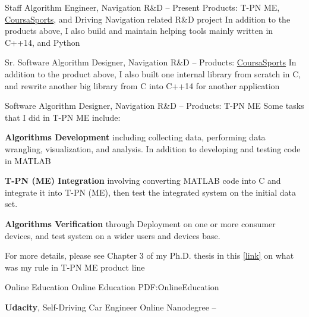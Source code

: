 \documentclass[letterpaper,MMMyyyy,nonstopmode]{simpleresumecv}
\begin{document}
\begin{Body}
\Gap
Staff Algorithm Engineer, Navigation R\&D
\hfill
{} --
Present
\BulletItem
Products:
T-PN ME, \href{http://www.coursasports.com/}{CoursaSports}, and Driving Navigation related R\&D project
\BulletItem
In addition to the products above, I also build and maintain helping tools mainly\newline 
written in C++14, and Python

\Gap
Sr. Software Algorithm Designer, Navigation R\&D
\hfill
{} --
\BulletItem
Products:
\href{http://www.coursasports.com/}{CoursaSports}
\BulletItem
In addition to the product above, I also built one internal library from scratch in C,\newline
and rewrite another big library from C into C++14 for another application

\BigGap
Software Algorithm Designer, Navigation R\&D
\hfill
{} --
\BulletItem
Products: T-PN ME
\BulletItem
Some tasks that I did in T-PN ME include: 
\begin{Detail}
\SubBulletItem
\textbf{Algorithms Development} including collecting data, performing data wrangling, visualization, and analysis. In addition to developing and testing code in MATLAB

\SubBulletItem
\textbf{T-PN (ME) Integration} involving converting MATLAB code into C and integrate it into T-PN (ME), then test the integrated system on the initial data set. 

\SubBulletItem
\textbf{Algorithms Verification} through Deployment on one or more consumer devices, and test system on a wider users and devices base.
\end{Detail}

\BulletItem
For more details, please see Chapter 3 of my Ph.D. thesis in this \href{https://qspace.library.queensu.ca/bitstream/handle/1974/12804/Omr_Medhat_201504_PhD.pdf?sequence=1}{[link]} on what was my rule in T-PN ME product line


\Section
{Online \newline
Education}
{Online Education}
{PDF:OnlineEducation}

\Entry
{\textbf{Udacity}},
Self-Driving Car Engineer Online Nanodegree
\hfill
{} --


\end{Body}
\end{document}
